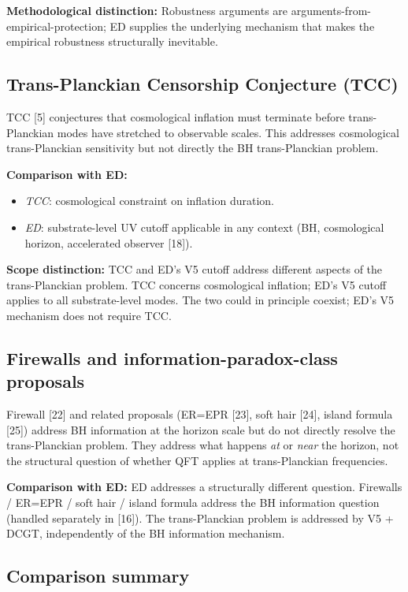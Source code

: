 \documentclass[11pt,a4paper]{article}
\begin{document}
\textbf{Methodological distinction:} Robustness arguments are arguments-from-empirical-protection; ED supplies the underlying mechanism that makes the empirical robustness structurally inevitable.

\subsection{Trans-Planckian Censorship Conjecture (TCC)}

TCC [5] conjectures that cosmological inflation must terminate before trans-Planckian modes have stretched to observable scales. This addresses cosmological trans-Planckian sensitivity but not directly the BH trans-Planckian problem.

\textbf{Comparison with ED:}
\begin{itemize}[noitemsep]
\item \emph{TCC}: cosmological constraint on inflation duration.
\item \emph{ED}: substrate-level UV cutoff applicable in any context (BH, cosmological horizon, accelerated observer [18]).
\end{itemize}

\textbf{Scope distinction:} TCC and ED's V5 cutoff address different aspects of the trans-Planckian problem. TCC concerns cosmological inflation; ED's V5 cutoff applies to all substrate-level modes. The two could in principle coexist; ED's V5 mechanism does not require TCC.

\subsection{Firewalls and information-paradox-class proposals}

Firewall [22] and related proposals (ER=EPR [23], soft hair [24], island formula [25]) address BH information at the horizon scale but do not directly resolve the trans-Planckian problem. They address what happens \emph{at} or \emph{near} the horizon, not the structural question of whether QFT applies at trans-Planckian frequencies.

\textbf{Comparison with ED:} ED addresses a structurally different question. Firewalls / ER=EPR / soft hair / island formula address the BH information question (handled separately in [16]). The trans-Planckian problem is addressed by V5 + DCGT, independently of the BH information mechanism.

\subsection{Comparison summary}
\end{document}
